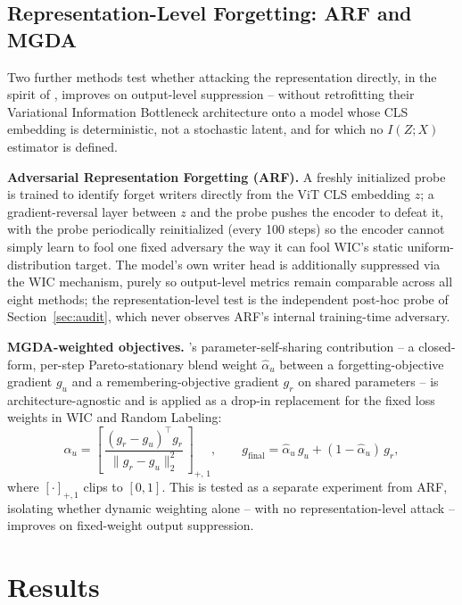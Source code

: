 \documentclass[a4paper,fleqn]{cas-dc}
\begin{document}
\subsection{Representation-Level Forgetting: ARF and MGDA}
\label{sec:arf-mgda}

Two further methods test whether attacking the representation directly, in
the spirit of \citet{wang2026rfuss}, improves on output-level suppression
-- without retrofitting their Variational Information Bottleneck
architecture onto a model whose CLS embedding is deterministic, not a
stochastic latent, and for which no $I(Z;X)$ estimator is defined.

\textbf{Adversarial Representation Forgetting (ARF).} A freshly initialized
probe is trained to identify forget writers directly from the ViT CLS
embedding $z$; a gradient-reversal layer \citep{ganin2015dann} between $z$
and the probe pushes the encoder to defeat it, with the probe periodically
reinitialized (every 100 steps) so the encoder cannot simply learn to fool
one fixed adversary the way it can fool WIC's static uniform-distribution
target. The model's own writer head is additionally suppressed via the WIC
mechanism, purely so output-level metrics remain comparable across all
eight methods; the representation-level test is the independent post-hoc
probe of Section~\ref{sec:audit}, which never observes ARF's internal
training-time adversary.

\textbf{MGDA-weighted objectives.} \citeauthor{wang2026rfuss}'s
parameter-self-sharing contribution -- a closed-form, per-step
Pareto-stationary blend weight $\hat\alpha_u$ between a forgetting-objective
gradient $g_u$ and a remembering-objective gradient $g_r$ on shared
parameters \citep{sener2018mtl,desideri2012mgda} -- is architecture-agnostic
and is applied as a drop-in replacement for the fixed loss weights in WIC
and Random Labeling:
\begin{equation}
\hat\alpha_u = \left[\, \frac{(g_r-g_u)^{\!\top} g_r}{\lVert g_r-g_u \rVert_2^2} \,\right]_{+,\,1},
\qquad
g_{\text{final}} = \hat\alpha_u\, g_u + (1-\hat\alpha_u)\, g_r,
\label{eq:mgda}
\end{equation}
where $[\cdot]_{+,1}$ clips to $[0,1]$. This is tested as a separate
experiment from ARF, isolating whether dynamic weighting alone -- with no
representation-level attack -- improves on fixed-weight output suppression.

\section{Results}
\label{sec:results}
\end{document}
